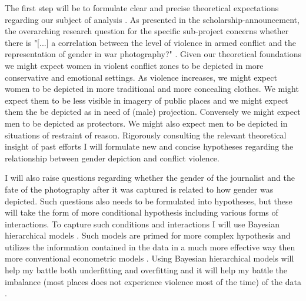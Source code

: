 \documentclass[a4paper]{article}
\begin{document}
The first step will be to formulate clear and precise theoretical expectations regarding our subject of analysis \cite[30-53]{Cederman_Gleditsch_Buhaug_2013}. As presented in the scholarship-announcement, the overarching research question for the specific sub-project concerns whether there is "[...] a correlation between the level of violence in armed conflict and the representation of gender in war photography?" \citep{bodies}. Given our theoretical foundations we might expect women in violent conflict zones to be depicted in more conservative and emotional settings. As violence increases, we might expect women to be depicted in more traditional and more concealing clothes. We might expect them to be less visible in imagery of public places and we might expect them the be depicted as in need of (male) projection. Conversely we might expect men to be depicted as protectors. We might also expect men to be depicted in situations of restraint of reason. 
Rigorously consulting the relevant theoretical insight of past efforts I will formulate new and concise hypotheses regarding the relationship between gender depiction and conflict violence.\par 

I will also raise questions regarding whether the gender of the journalist and the fate of the photography after it was captured is related to how gender was depicted. Such questions also needs to be formulated into hypotheses, but these will take the form of more conditional hypothesis including various forms of interactions. To capture such conditions and interactions I will use Bayesian hierarchical models \citep{Gelman_2006, Gelman_2013, Mcelreath_2018}. Such models are primed for more complex hypothesis and utilizes the information contained in the data in a much more effective way then more conventional econometric models \cite[355]{Mcelreath_2018}. Using Bayesian hierarchical models will help my battle both underfitting and overfitting and it will help my battle the imbalance (most places does not experience violence most of the time) of the data \cite[356-357]{Mcelreath_2018}. \par
\end{document}
